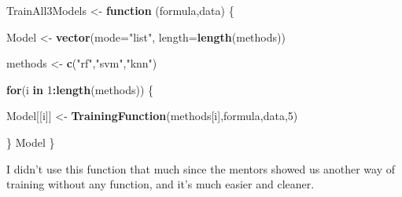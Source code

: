 \documentclass[]{article}
\newenvironment{Shaded}{\begin{snugshade}}{\end{snugshade}}
\newcommand{\KeywordTok}[1]{\textcolor[rgb]{0.13,0.29,0.53}{\textbf{#1}}}
\newcommand{\DataTypeTok}[1]{\textcolor[rgb]{0.13,0.29,0.53}{#1}}
\newcommand{\DecValTok}[1]{\textcolor[rgb]{0.00,0.00,0.81}{#1}}
\newcommand{\StringTok}[1]{\textcolor[rgb]{0.31,0.60,0.02}{#1}}
\newcommand{\ControlFlowTok}[1]{\textcolor[rgb]{0.13,0.29,0.53}{\textbf{#1}}}
\newcommand{\OperatorTok}[1]{\textcolor[rgb]{0.81,0.36,0.00}{\textbf{#1}}}
\newcommand{\NormalTok}[1]{#1}
\begin{document}
\begin{Shaded}
\begin{Highlighting}[]
\NormalTok{TrainAll3Models <-}\StringTok{ }\ControlFlowTok{function}\NormalTok{ (formula,data)}
\NormalTok{  \{}

\NormalTok{  Model <-}\StringTok{ }\KeywordTok{vector}\NormalTok{(}\DataTypeTok{mode=}\StringTok{"list"}\NormalTok{, }\DataTypeTok{length=}\KeywordTok{length}\NormalTok{(methods))}

\NormalTok{      methods <-}\StringTok{ }\KeywordTok{c}\NormalTok{(}\StringTok{"rf"}\NormalTok{,}\StringTok{"svm"}\NormalTok{,}\StringTok{"knn"}\NormalTok{)}
        
      \ControlFlowTok{for}\NormalTok{(i }\ControlFlowTok{in} \DecValTok{1}\OperatorTok{:}\KeywordTok{length}\NormalTok{(methods))}
\NormalTok{          \{    }
      
\NormalTok{            Model[[i]] <-}\StringTok{ }\KeywordTok{TrainingFunction}\NormalTok{(methods[i],formula,data,}\DecValTok{5}\NormalTok{)}

               

\NormalTok{      \}}
\NormalTok{    Model}
\NormalTok{\}}
\end{Highlighting}
\end{Shaded}

 I didn't use this function that much since the mentors showed us
another way of training without any function, and it's much easier and
cleaner.
\end{document}

